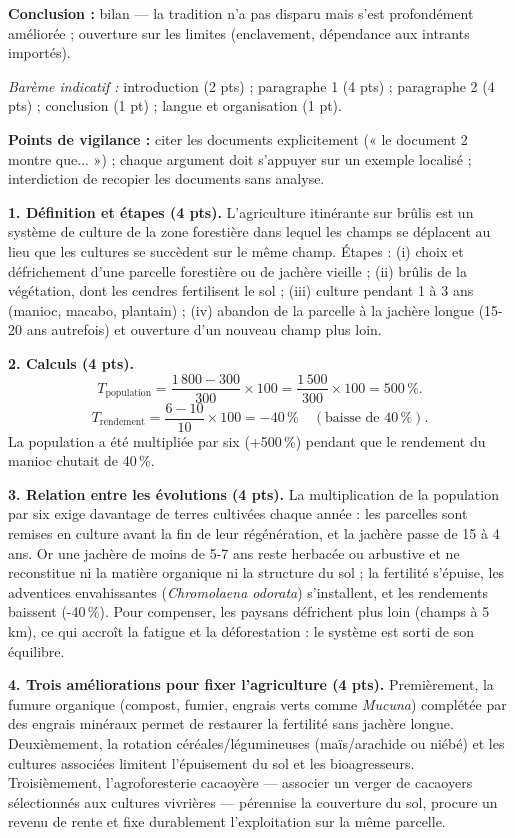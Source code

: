 \documentclass[11pt]{article}
\begin{document}
\begin{corrige}
\textbf{Conclusion :} bilan — la tradition n'a pas disparu mais s'est profondément améliorée ; ouverture sur les limites (enclavement, dépendance aux intrants importés).

\emph{Barème indicatif :} introduction (2 pts) ; paragraphe 1 (4 pts) ; paragraphe 2 (4 pts) ; conclusion (1 pt) ; langue et organisation (1 pt).

\textbf{Points de vigilance :} citer les documents explicitement (« le document 2 montre que... ») ; chaque argument doit s'appuyer sur un exemple localisé ; interdiction de recopier les documents sans analyse.
\end{corrige}

\begin{corrige}
\textbf{1. Définition et étapes (4 pts).} L'agriculture itinérante sur brûlis est un système de culture de la zone forestière dans lequel les champs se déplacent au lieu que les cultures se succèdent sur le même champ. Étapes : (i) choix et défrichement d'une parcelle forestière ou de jachère vieille ; (ii) brûlis de la végétation, dont les cendres fertilisent le sol ; (iii) culture pendant 1 à 3 ans (manioc, macabo, plantain) ; (iv) abandon de la parcelle à la jachère longue (15-20 ans autrefois) et ouverture d'un nouveau champ plus loin.

\textbf{2. Calculs (4 pts).}
\[ T_{\text{population}} = \frac{1\,800 - 300}{300} \times 100 = \frac{1\,500}{300} \times 100 = 500\,\%. \]
\[ T_{\text{rendement}} = \frac{6 - 10}{10} \times 100 = -40\,\% \quad (\text{baisse de } 40\,\%). \]
La population a été multipliée par six (+500\,\%) pendant que le rendement du manioc chutait de 40\,\%.

\textbf{3. Relation entre les évolutions (4 pts).} La multiplication de la population par six exige davantage de terres cultivées chaque année : les parcelles sont remises en culture avant la fin de leur régénération, et la jachère passe de 15 à 4 ans. Or une jachère de moins de 5-7 ans reste herbacée ou arbustive et ne reconstitue ni la matière organique ni la structure du sol ; la fertilité s'épuise, les adventices envahissantes (\emph{Chromolaena odorata}) s'installent, et les rendements baissent (-40\,\%). Pour compenser, les paysans défrichent plus loin (champs à 5 km), ce qui accroît la fatigue et la déforestation : le système est sorti de son équilibre.

\textbf{4. Trois améliorations pour fixer l'agriculture (4 pts).} Premièrement, la fumure organique (compost, fumier, engrais verts comme \emph{Mucuna}) complétée par des engrais minéraux permet de restaurer la fertilité sans jachère longue. Deuxièmement, la rotation céréales/légumineuses (maïs/arachide ou niébé) et les cultures associées limitent l'épuisement du sol et les bioagresseurs. Troisièmement, l'agroforesterie cacaoyère — associer un verger de cacaoyers sélectionnés aux cultures vivrières — pérennise la couverture du sol, procure un revenu de rente et fixe durablement l'exploitation sur la même parcelle.


\end{corrige}
\end{document}
